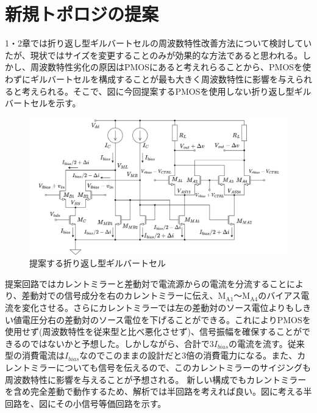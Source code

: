 \documentclass[twocolumn]{jsarticle}
\begin{document}
\section{新規トポロジの提案}
    1・2章では折り返し型ギルバートセルの周波数特性改善方法について検討していたが、現状ではサイズを変更することのみが効果的な方法であると思われる。しかし、周波数特性劣化の原因はPMOSにあると考えれらることから、PMOSを使わずにギルバートセルを構成することが最も大きく周波数特性に影響を与えられると考えられる。そこで、図に今回提案するPMOSを使用しない折り返し型ギルバートセルを示す。
    \begin{figure}[t]
        \begin{center}
            \includegraphics*[width = 160mm]{figures/NtoNFolded.png}
            \caption{提案する折り返し型ギルバートセル}
            \label{fig:NtoN_folded}
        \end{center}
    \end{figure}
    提案回路ではカレントミラーと差動対で電流源からの電流を分流することにより、差動対での信号成分を右のカレントミラーに伝え、$\mathrm{M_{A1}}$～$\mathrm{M_{A4}}$のバイアス電流を変化させる。さらにカレントミラーでは左の差動対のソース電位よりもしきい値電圧分右の差動対のソース電位を下げることができる。これによりPMOSを使用せず(周波数特性を従来型と比べ悪化させず)、信号振幅を確保することができるのではないかと予想した。しかしながら、合計で$3I_{bias}$の電流を流す。従来型の消費電流は$I_{bias}$なのでこのままの設計だと3倍の消費電力になる。また、カレントミラーについても信号を伝えるので、このカレントミラーのサイジングも周波数特性に影響を与えることが予想される。
    新しい構成でもカレントミラーを含め完全差動で動作するため、解析では半回路を考えれば良い。図に考える半回路を、図にその小信号等価回路を示す。
\end{document}
